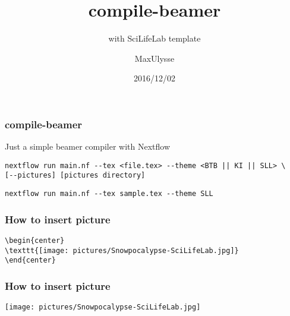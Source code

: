\documentclass{beamer}
\title{compile-beamer}
\subtitle{with SciLifeLab template}
\author{MaxUlysse}
\institute{Barntumörbanken / SciLifeLab}
\date{2016/12/02}
\begin{document}
\begin{frame}
\titlepage
\end{frame}

\begin{frame}[fragile]
\frametitle{compile-beamer}
Just a simple beamer compiler with Nextflow
\begin{lstlisting}[title=Usage]
nextflow run main.nf --tex <file.tex> --theme <BTB || KI || SLL> \
[--pictures] [pictures directory]
\end{lstlisting}
\begin{lstlisting}[title=This file was made using]
nextflow run main.nf --tex sample.tex --theme SLL
\end{lstlisting}
\end{frame}

\begin{frame}[fragile]
\frametitle{How to insert picture}
\begin{lstlisting}[title=Code]
\begin{center}
\texttt{[image: pictures/Snowpocalypse-SciLifeLab.jpg]}
\end{center}
\end{lstlisting}
\end{frame}

\begin{frame}
\frametitle{How to insert picture}
\begin{center}
\texttt{[image: pictures/Snowpocalypse-SciLifeLab.jpg]}
\end{center}
\end{frame}
\end{document}
